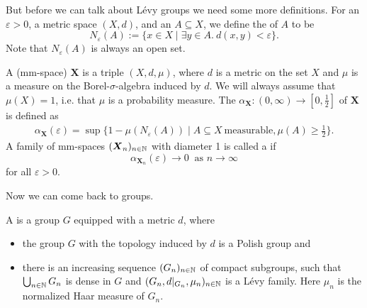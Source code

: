		
		
But before we can talk about L\'evy groups we need some more definitions. For an $\varepsilon>0$, a metric space $(X,d)$, and an $A\subseteq X$, we define the  of $A$ to be 
\[N_\varepsilon(A):=\{x\in X\mid\exists y\in A.\  d(x,y)<\varepsilon\}.\]
Note that $N_\varepsilon(A)$ is always an open set.
\begin{definition}
	A  (mm-space) $\boldsymbol{X}$ is a triple $(X,d,\mu)$, where $d$ is a metric on the set $X$ and $\mu$ is a measure on the Borel-$\sigma$-algebra induced by $d$. We will always assume that $\mu(X)=1$, i.e. that $\mu$ is a probability measure.  
	The  $\alpha_{\boldsymbol{X}}\colon(0,\infty)\to[0,\frac{1}{2}]$ of $\boldsymbol{X}$ is defined as 
	\begin{align*}
		\alpha_{\boldsymbol{X}}(\varepsilon)=\sup\{1-\mu(N_\varepsilon(A))\mid A\subseteq X\ \text{measurable}, \mu(A)\geq\frac{1}{2}\}. 
	\end{align*}
	A family of mm-spaces $(\boldsymbol{X}_n)_{n\in\mathbb{N}}$ with diameter 1 is called a  if 
	\[\alpha_{\boldsymbol{X}_n}(\varepsilon)\to 0\ \text{ as $n\to\infty$}\]
	for all $\varepsilon>0$.
\end{definition}
		
Now we can come back to groups.
\begin{definition}\label{def:Levy}
	A  is a group $G$ equipped with a metric $d$, where
	\begin{itemize}
		\item the group $G$ with the topology induced by $d$ is a Polish group and
		\item there is an increasing sequence $(G_n)_{n\in\mathbb{N}}$ of compact subgroups, such that $\bigcup_{n\in\mathbb{N}} G_n$ is dense in $G$ and $(G_n,d|_{G_n},\mu_n)_{n\in\mathbb{N}}$ is a L\'evy family. Here $\mu_n$ is the normalized Haar measure of $G_n$.
	\end{itemize}  
\end{definition}
		
